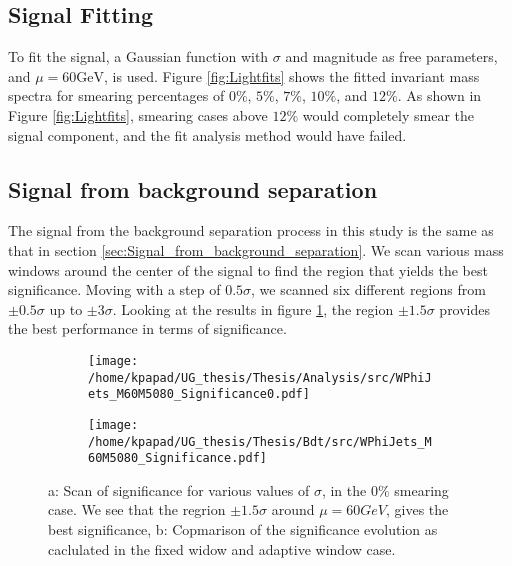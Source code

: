 \subsection{Signal Fitting}
\label{sec:orgd9ebfef}
\label{sec:Light_signal_fitting}
To fit the signal, a Gaussian function with \(\sigma\) and magnitude as free parameters, and \(\mu = 60\text{GeV}\), is used. Figure \ref{fig:Lightfits} shows the fitted invariant mass spectra for smearing percentages of \(0\%\), \(5\%\), \(7\%\), \(10\%\), and \(12\%\). As shown in Figure \ref{fig:Lightfits}, smearing cases above \(12\%\) would completely smear the signal component, and the fit analysis method would have failed.
\subsection{Signal from background separation}
\label{sec:orgb4ae30e}
\label{sec:Light_signal_from_background_separation}
The signal from the background separation process in this study is the same as that in section \ref{sec:Signal_from_background_separation}. We scan various mass windows around the center of the signal to find the region that yields the best significance. Moving with a step of \(0.5\sigma\), we scanned six different regions from \(\pm 0.5\sigma\) up to \(\pm 3\sigma\). Looking at the results in figure \ref{subfig:LightScan0}, the region \(\pm 1.5\sigma\) provides the best performance in terms of significance.
\begin{figure}[h]
\centering
\begin{subfigure}{0.45\textwidth}
\centering
\texttt{[image: /home/kpapad/UG\_thesis/Thesis/Analysis/src/WPhiJets\_M60M5080\_Significance0.pdf]}
\caption{}
\label{subfig:LightScan0}
\end{subfigure}
\begin{subfigure}{0.45\textwidth}
\centering
\texttt{[image: /home/kpapad/UG\_thesis/Thesis/Bdt/src/WPhiJets\_M60M5080\_Significance.pdf]}
\caption{}
\label{subfig:LightAdaFixedSig}
\end{subfigure}
\caption{a: Scan of significance for various values of $\sigma$, in the $0\%$ smearing case. We see that the regrion $\pm 1.5\sigma$ around $\mu=60GeV$, gives the best significance, b: Copmarison of the significance evolution as caclulated in the fixed widow and adaptive window case.}
\end{figure}

